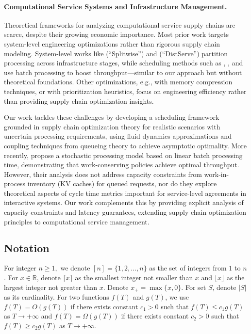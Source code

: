 \documentclass[poms,final,blindrev]{poms1_V1} %
\begin{document}
\paragraph{Computational Service Systems and Infrastructure Management.} 
Theoretical frameworks for analyzing computational service supply chains are scarce, despite their growing economic importance. Most prior work targets system-level engineering optimizations rather than rigorous supply chain modeling. System-level works like \citet{patel2023peeling} (``Splitwise'') and \citet{zhong2024distserve} (``DistServe'') partition processing across infrastructure stages, while scheduling methods such as \citet{yu2022orca}, \citet{agrawal2023sarathi}, and \citet{agrawal2024taming} use batch processing to boost throughput—similar to our approach but without theoretical foundations. Other optimizations, e.g., \citet{deepseekai2024deepseekv2strongeconomicalefficient} with memory compression techniques, or \citet{fu2025efficient} with prioritization heuristics, focus on engineering efficiency rather than providing supply chain optimization insights.

Our work tackles these challenges by developing a scheduling framework grounded in supply chain optimization theory for realistic scenarios with uncertain processing requirements, using fluid dynamics approximations and coupling techniques from queueing theory to achieve asymptotic optimality. More recently, \citet{li2025throughput} propose a stochastic processing model based on linear batch processing time, demonstrating that work-conserving policies achieve optimal throughput. However, their analysis does not address capacity constraints from work-in-process inventory (KV caches) for queued requests, nor do they explore theoretical aspects of cycle time metrics important for service-level agreements in interactive systems. Our work complements this by providing explicit analysis of capacity constraints and latency guarantees, extending supply chain optimization principles to computational service management.

\subsection{Notation}
For integer $n\ge 1,$ we denote $[n]=\{1,2,\dots,n\}$ as the set of integers from $1$ to $n$. For $x\in\mathbb{R}$, denote $\lceil x\rceil$ as the smallest integer not smaller than $x$ and $\lfloor x\rfloor$ as the largest integer not greater than $x$. Denote $x_+=\max\{x, 0\}$. For set $S$, denote $|S|$ as its cardinality. For two functions $f(T)$ and $g(T)$, we use $f(T)=O(g(T))$ if there exists constant $c_1>0$ such that $f(T)\le c_1g(T)$ as $T\to+\infty$ and $f(T)=\Omega(g(T))$ if there exists constant $c_2>0$ such that $f(T)\ge c_2g(T)$ as $T\to +\infty$.

\end{document}
